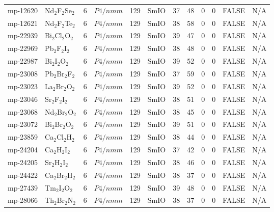 {\begin{longtable}{llcccccccccc}
    mp-12620 & Nd$_{2}$F$_{2}$Se$_{2}$ & 6     & $P4/nmm$ & 129   & SmIO  & 37    & 48    & 0     & 0     & FALSE & N/A \\
    mp-12621 & Nd$_{2}$F$_{2}$Te$_{2}$ & 6     & $P4/nmm$ & 129   & SmIO  & 38    & 58    & 0     & 0     & FALSE & N/A \\
    mp-22939 & Bi$_{2}$Cl$_{2}$O$_{2}$ & 6     & $P4/nmm$ & 129   & SmIO  & 39    & 47    & 0     & 0     & FALSE & N/A \\
    mp-22969 & Pb$_{2}$F$_{2}$I$_{2}$ & 6     & $P4/nmm$ & 129   & SmIO  & 38    & 48    & 0     & 0     & FALSE & N/A \\
    mp-22987 & Bi$_{2}$I$_{2}$O$_{2}$ & 6     & $P4/nmm$ & 129   & SmIO  & 39    & 52    & 0     & 0     & FALSE & N/A \\
    mp-23008 & Pb$_{2}$Br$_{2}$F$_{2}$ & 6     & $P4/nmm$ & 129   & SmIO  & 37    & 59    & 0     & 0     & FALSE & N/A \\
    mp-23023 & La$_{2}$Br$_{2}$O$_{2}$ & 6     & $P4/nmm$ & 129   & SmIO  & 39    & 52    & 0     & 0     & FALSE & N/A \\
    mp-23046 & Sr$_{2}$F$_{2}$I$_{2}$ & 6     & $P4/nmm$ & 129   & SmIO  & 38    & 51    & 0     & 0     & FALSE & N/A \\
    mp-23068 & Nd$_{2}$Br$_{2}$O$_{2}$ & 6     & $P4/nmm$ & 129   & SmIO  & 38    & 45    & 0     & 0     & FALSE & N/A \\
    mp-23072 & Bi$_{2}$Br$_{2}$O$_{2}$ & 6     & $P4/nmm$ & 129   & SmIO  & 39    & 51    & 0     & 0     & FALSE & N/A \\
    mp-23859 & Ca$_{2}$Cl$_{2}$H$_{2}$ & 6     & $P4/nmm$ & 129   & SmIO  & 38    & 44    & 0     & 0     & FALSE & N/A \\
    mp-24204 & Ca$_{2}$H$_{2}$I$_{2}$ & 6     & $P4/nmm$ & 129   & SmIO  & 37    & 42    & 0     & 0     & FALSE & N/A \\
    mp-24205 & Sr$_{2}$H$_{2}$I$_{2}$ & 6     & $P4/nmm$ & 129   & SmIO  & 38    & 46    & 0     & 0     & FALSE & N/A \\
    mp-24422 & Ca$_{2}$Br$_{2}$H$_{2}$ & 6     & $P4/nmm$ & 129   & SmIO  & 38    & 37    & 0     & 0     & FALSE & N/A \\
    mp-27439 & Tm$_{2}$I$_{2}$O$_{2}$ & 6     & $P4/nmm$ & 129   & SmIO  & 39    & 48    & 0     & 0     & FALSE & N/A \\
    mp-28066 & Th$_{2}$Br$_{2}$N$_{2}$ & 6     & $P4/nmm$ & 129   & SmIO  & 38    & 37    & 0     & 0     & FALSE & N/A \\

\end{longtable}}
